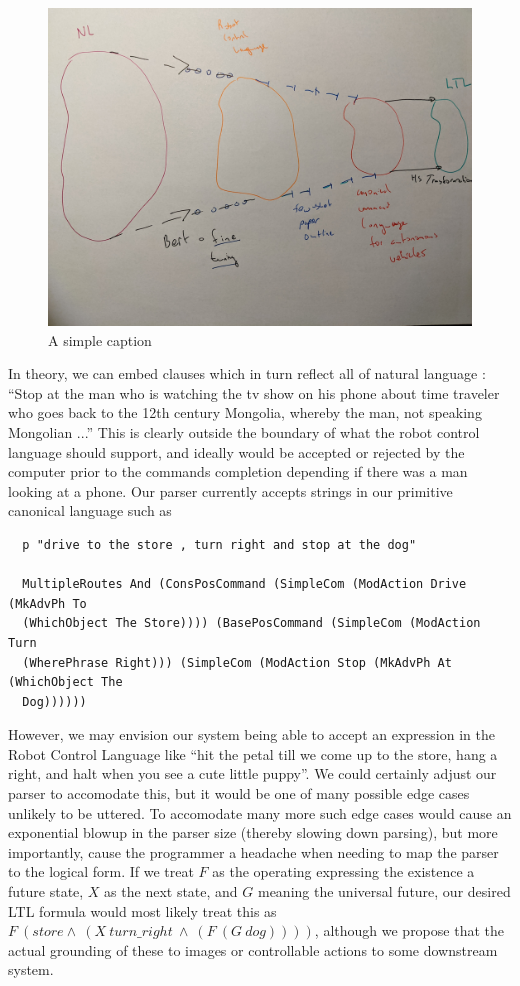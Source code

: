 \documentclass[a4paper, 11pt]{article}
\begin{document}
\begin{figure}
\centering
\includegraphics[width=150mm]{pics/three.jpg}
\caption{A simple caption}\label{fig:M3}
\end{figure}

In theory, we can embed clauses which in turn reflect all of natural language :
``Stop at the man who is watching the tv show on his phone about time traveler
who goes back to the 12th century Mongolia, whereby the man, not speaking
Mongolian ...'' This is clearly outside the boundary of what the robot control
language should support, and ideally would be accepted or rejected by the
computer prior to the commands completion depending if there was a man looking
at a phone. Our parser currently accepts strings in our primitive canonical
language such as

\begin{verbatim}
  p "drive to the store , turn right and stop at the dog"

  MultipleRoutes And (ConsPosCommand (SimpleCom (ModAction Drive (MkAdvPh To
  (WhichObject The Store)))) (BasePosCommand (SimpleCom (ModAction Turn
  (WherePhrase Right))) (SimpleCom (ModAction Stop (MkAdvPh At (WhichObject The
  Dog))))))
\end{verbatim}

However, we may envision our system being able to accept an expression in the
Robot Control Language like ``hit the petal till we come up to the store, hang a
right, and halt when you see a cute little puppy''. We could certainly adjust
our parser to accomodate this, but it would be one of many possible edge cases
unlikely to be uttered. To accomodate many more such edge cases would cause an
exponential blowup in the parser size (thereby slowing down parsing), but more
importantly, cause the programmer a headache when needing to map the parser to
the logical form. If we treat $F$ as the operating expressing the existence a
future state, $X$ as the next state, and $G$ meaning the universal future, our
desired LTL formula would most likely treat this as $F\ (store \land\ (X\
turn\_right\ \land\ (F\ (G\ dog))))$, although we propose that the actual
grounding of these to images or controllable actions to some downstream system.
\end{document}
